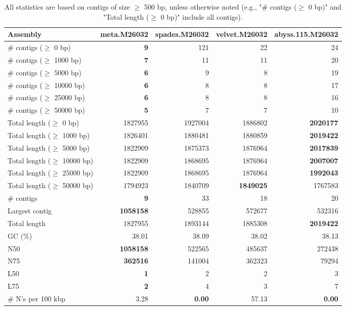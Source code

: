 \documentclass[12pt,a4paper]{article}
\begin{document}
\begin{table}[ht]
\begin{center}
\caption{All statistics are based on contigs of size $\geq$ 500 bp, unless otherwise noted (e.g., "\# contigs ($\geq$ 0 bp)" and "Total length ($\geq$ 0 bp)" include all contigs).}
\begin{tabular}{|l*{4}{|r}|}
\hline
Assembly & meta.M26032 & spades.M26032 & velvet.M26032 & abyss.115.M26032 \\ \hline
\# contigs ($\geq$ 0 bp) & {\bf 9} & 121 & 22 & 24 \\ \hline
\# contigs ($\geq$ 1000 bp) & {\bf 7} & 11 & 11 & 20 \\ \hline
\# contigs ($\geq$ 5000 bp) & {\bf 6} & 9 & 8 & 19 \\ \hline
\# contigs ($\geq$ 10000 bp) & {\bf 6} & 8 & 8 & 17 \\ \hline
\# contigs ($\geq$ 25000 bp) & {\bf 6} & 8 & 8 & 16 \\ \hline
\# contigs ($\geq$ 50000 bp) & {\bf 5} & 7 & 7 & 10 \\ \hline
Total length ($\geq$ 0 bp) & 1827955 & 1927004 & 1886802 & {\bf 2020177} \\ \hline
Total length ($\geq$ 1000 bp) & 1826401 & 1880481 & 1880859 & {\bf 2019422} \\ \hline
Total length ($\geq$ 5000 bp) & 1822909 & 1875373 & 1876964 & {\bf 2017839} \\ \hline
Total length ($\geq$ 10000 bp) & 1822909 & 1868695 & 1876964 & {\bf 2007007} \\ \hline
Total length ($\geq$ 25000 bp) & 1822909 & 1868695 & 1876964 & {\bf 1992043} \\ \hline
Total length ($\geq$ 50000 bp) & 1794923 & 1840709 & {\bf 1849025} & 1767583 \\ \hline
\# contigs & {\bf 9} & 33 & 18 & 20 \\ \hline
Largest contig & {\bf 1058158} & 528855 & 572677 & 532316 \\ \hline
Total length & 1827955 & 1893144 & 1885308 & {\bf 2019422} \\ \hline
GC (\%) & 38.01 & 38.09 & 38.02 & 38.13 \\ \hline
N50 & {\bf 1058158} & 522565 & 485637 & 272438 \\ \hline
N75 & {\bf 362516} & 141004 & 362323 & 79294 \\ \hline
L50 & {\bf 1} & 2 & 2 & 3 \\ \hline
L75 & {\bf 2} & 4 & 3 & 7 \\ \hline
\# N's per 100 kbp & 3.28 & {\bf 0.00} & 57.13 & {\bf 0.00} \\ \hline
\end{tabular}
\end{center}
\end{table}
\end{document}
